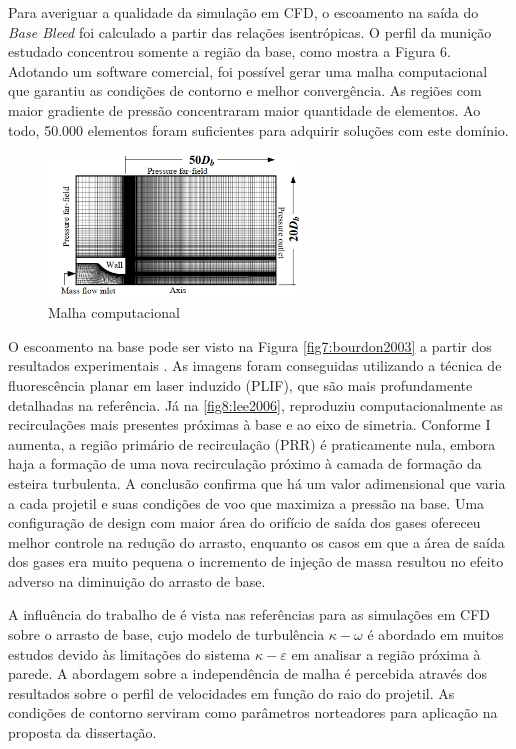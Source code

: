 Para averiguar a qualidade da simulação em CFD, o escoamento na saída do \textit{Base Bleed} foi calculado a partir das relações isentrópicas. O perfil da munição estudado concentrou somente a região da base, como mostra a Figura 6. Adotando um software comercial, foi possível gerar uma malha computacional que garantiu as condições de contorno e melhor convergência. As regiões com maior gradiente de pressão concentraram maior quantidade de elementos. Ao todo, 50.000 elementos foram suficientes para adquirir soluções com este domínio.

\begin{figure}[!ht]
	\centering
	\includegraphics[width=0.6\textwidth]{foto06-malha-lee&kim.png}
	\caption[Malha computacional]{Malha computacional \cite{Lee2006Sep}}
	\label{fig6:lee2006}
\end{figure}
	
O escoamento na base pode ser visto na Figura \ref{fig7:bourdon2003} a partir dos resultados experimentais \cite{Bourdon2003Feb}. As imagens foram conseguidas utilizando a técnica de fluorescência planar em laser induzido (PLIF), que são mais profundamente detalhadas na referência. Já na \autoref{fig8:lee2006}, \citeauthor{Lee2006Sep} reproduziu computacionalmente as recirculações mais presentes próximas à base e ao eixo de simetria. Conforme I aumenta, a região primário de recirculação (PRR) é praticamente nula, embora haja a formação de uma nova recirculação próximo à camada de formação da esteira turbulenta. A conclusão confirma que há um valor adimensional que varia a cada projetil e suas condições de voo que maximiza a pressão na base. Uma configuração de design com maior área do orifício de saída dos gases ofereceu melhor controle na redução do arrasto, enquanto os casos em que a área de saída dos gases era muito pequena o incremento de injeção de massa resultou no efeito adverso na diminuição do arrasto de base. 

A influência do trabalho de \citeauthor{Lee2006Sep} é vista nas referências para as simulações em CFD sobre o arrasto de base, cujo modelo de turbulência $\kappa-\omega$ é abordado em muitos estudos devido às limitações do sistema $\kappa-\varepsilon$ em analisar a região próxima à parede. A abordagem sobre a independência de malha é percebida através dos resultados sobre o perfil de velocidades em função do raio do projetil. As condições de contorno serviram como parâmetros norteadores para aplicação na proposta da dissertação.

